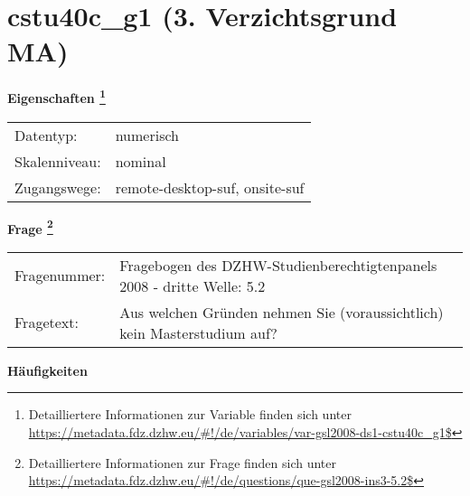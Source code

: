 
    \setcounter{footnote}{0}

    \vspace*{-1.8cm}
	\section{cstu40c\_g1 (3. Verzichtsgrund MA)}
	\label{section:cstu40c_g1}



    \vspace*{0.5cm}
    \noindent\textbf{Eigenschaften
	\footnote{Detailliertere Informationen zur Variable finden sich unter
		\url{https://metadata.fdz.dzhw.eu/\#!/de/variables/var-gsl2008-ds1-cstu40c_g1$}}}\\
	\begin{tabularx}{\hsize}{@{}lX}
	Datentyp: & numerisch \\
	Skalenniveau: & nominal \\
	Zugangswege: &
	  remote-desktop-suf, 
	  onsite-suf
 \\
    \end{tabularx}



				\vspace*{0.5cm}
                \noindent\textbf{Frage
	                \footnote{Detailliertere Informationen zur Frage finden sich unter
		              \url{https://metadata.fdz.dzhw.eu/\#!/de/questions/que-gsl2008-ins3-5.2$}}}\\
				\begin{tabularx}{\hsize}{@{}lX}
					Fragenummer: &
					  Fragebogen des DZHW-Studienberechtigtenpanels 2008 - dritte Welle:
					  5.2
 \\
					Fragetext: & Aus welchen Gründen nehmen Sie (voraussichtlich) kein Masterstudium auf? \\
				\end{tabularx}





        		\vspace*{0.5cm}
                \noindent\textbf{Häufigkeiten}

